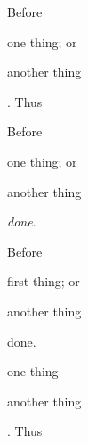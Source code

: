 \documentclass{article}
\begin{document}
Before\begin{enumerate*}
    \item one thing; or \item another thing
\end{enumerate*}. Thus

Before\begin{itemize*}
    \item one thing; or \item another thing
\end{itemize*}\emph{done}.

Before\begin{description*}
    \item[One] first thing; or \item[Two] another thing
\end{description*}{done}.

\begin{enumerate*}[itemjoin={{; }}]
    \item one thing \item another thing
\end{enumerate*}%
. Thus
\end{document}
